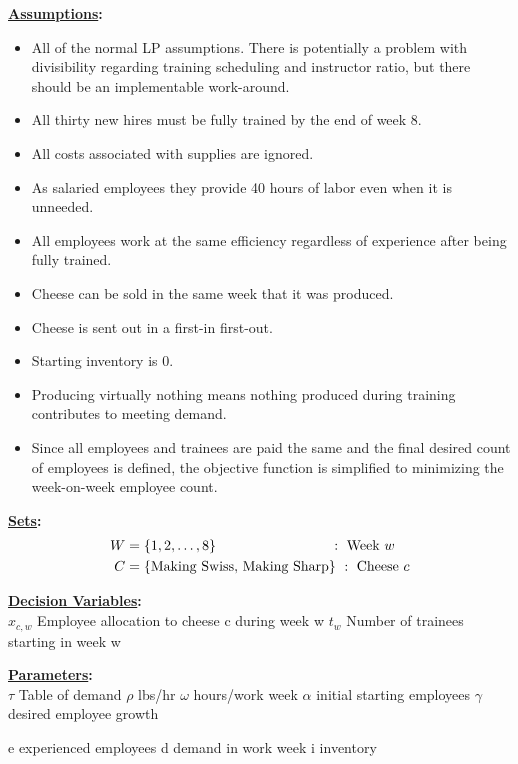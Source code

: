 \documentclass[12pt]{amsart}
\begin{document}
\bigskip\bigskip

\textbf{\underline{Assumptions}:}
\begin{itemize}
	\item All of the normal LP assumptions. 
	There is potentially a problem with divisibility regarding training scheduling and instructor ratio,
	but there should be an implementable work-around. 
	\item All thirty new hires must be fully trained by the end of week 8.
	\item All costs associated with supplies are ignored.
	\item As salaried employees they provide 40 hours of labor even when it is unneeded.
	\item All employees work at the same efficiency regardless of experience after being fully trained.
	\item Cheese can be sold in the same week that it was produced.
	\item Cheese is sent out in a first-in first-out.
	\item Starting inventory is 0.
	\item Producing virtually nothing means nothing produced during training contributes to meeting demand.
	\item Since all employees and trainees are paid the same and the final desired count of employees is defined, 
	the objective function is simplified to minimizing the week-on-week employee count.
\end{itemize}


\textbf{\underline{Sets}:}
\begin{align*}
	W &= \{1,2,\ldots,8\}\hspace{19ex} :\  \text{Week } w \\
	C &= \{\text{Making Swiss},\, \text{Making Sharp}\}\ :\  \text{Cheese } c
\end{align*}

\textbf{\underline{Decision Variables}:} \\
\(x_{c,w}\) Employee allocation to cheese c during week w
\(t_w\) Number of trainees starting in week w

\textbf{\underline{Parameters}:} \\

\(\tau\) Table of demand
\(\rho\) lbs/hr
\(\omega\) hours/work week
\(\alpha\) initial starting employees
\(\gamma\) desired employee growth

e experienced employees
d demand in work week
i inventory
\end{document}
